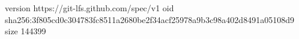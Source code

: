 version https://git-lfs.github.com/spec/v1
oid sha256:3f805cd0c304783fc8511a2680be2f34acf25978a9b3c98a402d8491a05108d9
size 144399

